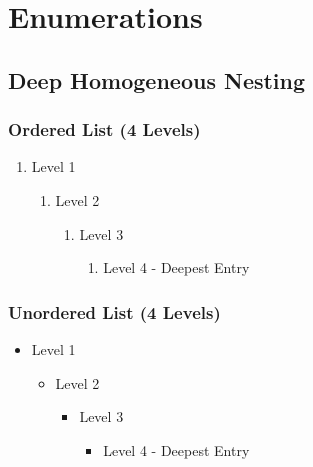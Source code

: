 \chapter{Enumerations}
\section{Deep Homogeneous Nesting}


\subsection{Ordered List (4 Levels)}
\begin{enumerate}
  \item Level 1
    \begin{enumerate}
      \item Level 2
        \begin{enumerate}
          \item Level 3
            \begin{enumerate}
              \item Level 4 - Deepest Entry
            \end{enumerate}
        \end{enumerate}
    \end{enumerate}
\end{enumerate}


\subsection{Unordered List (4 Levels)}
\begin{itemize}
  \item Level 1
    \begin{itemize}
      \item Level 2
        \begin{itemize}
          \item Level 3
            \begin{itemize}
              \item Level 4 - Deepest Entry
            \end{itemize}
        \end{itemize}
    \end{itemize}
\end{itemize}


